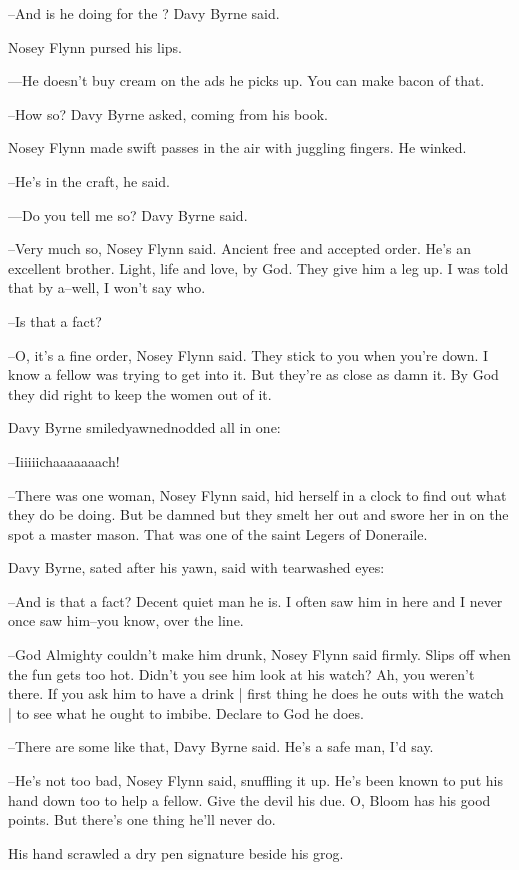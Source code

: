 --And is he doing for the ?
Davy Byrne said.

Nosey Flynn pursed his lips.

---He doesn't buy cream on the ads he picks up.
You can make bacon of that.

--How so?
Davy Byrne asked,
coming from his book.

Nosey Flynn made swift passes in the air with juggling fingers.
He winked.

--He's in the craft,
he said.

---Do you tell me so?
Davy Byrne said.

--Very much so,
Nosey Flynn said.
Ancient free and accepted order.
He's an excellent brother.
Light, life and love, by God.
They give him a leg up.
I was told that by a--well,
I won't say who.

--Is that a fact?

--O, it's a fine order,
Nosey Flynn said.
They stick to you when you're down.
I know a fellow was trying to get into it.
But they're as close as damn it.
By God they did right to keep the women out of it.

Davy Byrne smiledyawnednodded all in one:

--Iiiiiichaaaaaaach!

--There was one woman,
Nosey Flynn said,
hid herself in a clock to find
out what they do be doing.
But be damned but they smelt her out
and swore her in on the spot a master mason.
That was one of the saint Legers of Doneraile.

Davy Byrne,
sated after his yawn,
said with tearwashed eyes:

--And is that a fact?
Decent quiet man he is.
I often saw him in here
and I never once saw him--you know,
over the line.

--God Almighty couldn't make him drunk,
Nosey Flynn said firmly.
Slips off when the fun gets too hot.
Didn't you see him look at his watch?
Ah, you weren't there.
If you ask him to have a drink |
first thing he does he outs with the watch |
to see what he ought to imbibe.
Declare to God he does.

--There are some like that,
Davy Byrne said.
He's a safe man, I'd say.

--He's not too bad,
Nosey Flynn said, snuffling it up.
He's been known to put his hand down too to help a fellow.
Give the devil his due.
O, Bloom has his good points.
But there's one thing he'll never do.

His hand scrawled a dry pen signature beside his grog.

